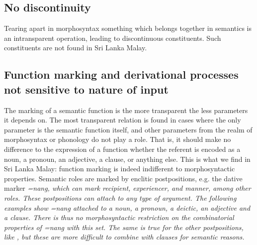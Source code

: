 \documentclass[a4paper]{article}
\begin{document}
\subsection{No discontinuity}
Tearing apart in morphosyntax something which belongs together in semantics is an intransparent operation, leading to discontinuous constituents. Such constituents are not found in Sri Lanka Malay.


\subsection{Function marking and derivational processes not sensitive to nature of input}\label{sec:functionmarking}

The marking of a semantic function is the more transparent the less parameters it depends on. The most transparent relation is found in cases where the only parameter is the semantic function itself, and other parameters from the realm of morphosyntax or phonology do not play a role.  That is, it should make no difference to the expression of a function whether the referent is encoded as a noun, a pronoun, an adjective, a clause, or anything else. This is what we find in Sri Lanka Malay: function marking is indeed indifferent to morphosyntactic properties. Semantic roles are marked by enclitic postpositions, e.g. the dative marker \em =nang\em, which can mark recipient, experiencer, and manner, among other roles. These postpositions can attach to any type of argument. The following examples show \em =nang \em attached to a noun, a pronoun, a deictic, an adjective and a clause. There is thus no morphosyntactic restriction on the combinatorial properties of \em =nang \em with this set. The same is true for the other postpositions, like , but these are more difficult to combine with clauses for semantic reasons.




\end{document}
